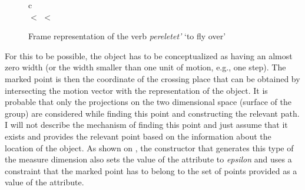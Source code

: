 \begin{figure}
\begin{center}
\begin{tabular}{c}
\\
 $<$  $<$ 
\end{tabular}
\end{center}
\caption{Frame representation of the verb \textit{pereletet'} `to fly over' \label{frame:pere:letet}}
\end{figure}

For this to be possible, the object has to be conceptualized as having an almost zero width (or the width smaller than one unit of motion, e.g., one step). The marked point is then the coordinate of the crossing place that can be obtained by intersecting the motion vector with the representation of the object. It is probable that only the projections on the two dimensional space (surface of the group) are considered while finding this point and constructing the relevant path. I will not describe the mechanism of finding this point and just assume that it exists and provides the relevant point based on the information about the location of the object. As shown on , the constructor that generates this type of the measure dimension also sets the value of the \WIDTH attribute to \textit{epsilon} and uses a constraint that the marked point has to belong to the set of points provided as a value of the \LOC attribute.


